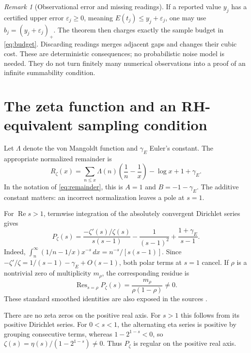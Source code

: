 \documentclass[11pt,a4paper]{article}
\theoremstyle{definition}
\theoremstyle{remark}
\newtheorem{remark}[theorem]{Remark}
\numberwithin{equation}{section}
\newcommand{\Rea}{\operatorname{Re}}
\newcommand{\Res}{\operatorname{Res}}
\begin{document}
\begin{remark}[Observational error and missing readings]
If a reported value \(y_j\) has a certified upper error
\(\varepsilon_j\geq0\), meaning \(E(t_j)\leq y_j+\varepsilon_j\),
one may use \(b_j=(y_j+\varepsilon_j)_+\). The theorem then charges
exactly the sample budget in \eqref{eq:budget}. Discarding readings
merges adjacent gaps and changes their cubic cost. These are
deterministic consequences; no probabilistic noise model is needed.
They do not turn finitely many numerical observations into a proof of
an infinite summability condition.
\end{remark}

\section{The zeta function and an RH-equivalent sampling condition}
\label{sec:zeta}

Let \(\Lambda\) denote the von Mangoldt function and \(\gamma_E\)
Euler's constant. The appropriate normalized remainder is
\begin{equation}
 R_\zeta(x)=\sum_{n\leq x}\Lambda(n)
      \left(\frac1n-\frac1x\right)-\log x+1+\gamma_E.
 \label{eq:zetaremainder}
\end{equation}
In the notation of \eqref{eq:remainder}, this is \(A=1\) and
\(B=-1-\gamma_E\). The additive constant matters: an incorrect
normalization leaves a pole at \(s=1\).

For \(\Rea s>1\), termwise integration of the absolutely convergent
Dirichlet series gives
\begin{equation}
 P_\zeta(s)=
 \frac{-\zeta'(s)/\zeta(s)}{s(s-1)}
 -\frac1{(s-1)^2}+\frac{1+\gamma_E}{s-1}.
 \label{eq:zetatransform}
\end{equation}
Indeed,
\(\int_n^\infty(1/n-1/x)x^{-s}\,dx=n^{-s}/[s(s-1)]\).
Since
\(-\zeta'/\zeta=1/(s-1)-\gamma_E+O(s-1)\), both polar terms at
\(s=1\) cancel. If \(\rho\) is a nontrivial zero of multiplicity
\(m_\rho\), the corresponding residue is
\begin{equation}
 \Res_{s=\rho}P_\zeta(s)
   =\frac{m_\rho}{\rho(1-\rho)}\ne0.
 \label{eq:zetaresidue}
\end{equation}
These standard smoothed identities are also exposed in the sources
\cite{primeerror,rubinstein}.

There are no zeta zeros on the positive real axis. For \(s>1\) this
follows from its positive Dirichlet series. For \(0<s<1\), the
alternating eta series is positive by grouping consecutive terms,
whereas \(1-2^{1-s}<0\), so
\(\zeta(s)=\eta(s)/(1-2^{1-s})\ne0\). Thus \(P_\zeta\) is
regular on the positive real axis.
\end{document}
